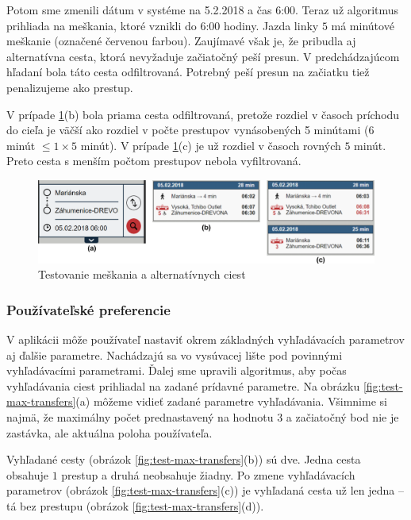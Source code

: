 Potom sme zmenili dátum v systéme na 5.2.2018 a čas 6:00. Teraz už algoritmus prihliada na meškania, ktoré vznikli do 6:00 hodiny. Jazda linky $5$ má minútové meškanie (označené červenou farbou). Zaujímavé však je, že pribudla aj alternatívna cesta, ktorá nevyžaduje začiatočný peší presun. V predchádzajúcom hľadaní bola táto cesta odfiltrovaná. Potrebný peší presun na začiatku tiež penalizujeme ako prestup. 
 
V prípade \ref{fig:test-delay-alternative}(b) bola priama cesta odfiltrovaná, pretože rozdiel v časoch príchodu do cieľa je väčší ako rozdiel v počte prestupov vynásobených 5 minútami ($6$ minút $\leq 1\times5$ minút).
V prípade \ref{fig:test-delay-alternative}(c) je už rozdiel v časoch rovných $5$ minút. Preto cesta s menším počtom prestupov nebola vyfiltrovaná.

\begin{figure}[H]
\centerline{\includegraphics[width=1.0\textwidth]{images/test/delay-alternative}}
\caption[Testovanie meškania a alternatívnych ciest]{Testovanie meškania a alternatívnych ciest}
\label{fig:test-delay-alternative}
\end{figure}

\subsubsection{Používateľské preferencie}

V aplikácii môže používateľ nastaviť okrem základných vyhľadávacích parametrov aj ďalšie parametre. Nachádzajú sa vo vysúvacej lište pod povinnými vyhľadávacími parametrami. Ďalej sme upravili algoritmus, aby počas vyhľadávania ciest prihliadal na zadané prídavné parametre. Na obrázku \ref{fig:test-max-transfers}(a) môžeme vidieť zadané parametre vyhľadávania. Všimnime si najmä, že maximálny počet prednastavený na hodnotu $3$ a začiatočný bod nie je zastávka, ale aktuálna poloha používateľa. 

Vyhľadané cesty (obrázok \ref{fig:test-max-transfers}(b)) sú dve. Jedna cesta obsahuje $1$ prestup a druhá neobsahuje žiadny. Po zmene vyhľadávacích parametrov (obrázok \ref{fig:test-max-transfers}(c)) je vyhľadaná cesta už len jedna – tá bez prestupu (obrázok \ref{fig:test-max-transfers}(d)).

